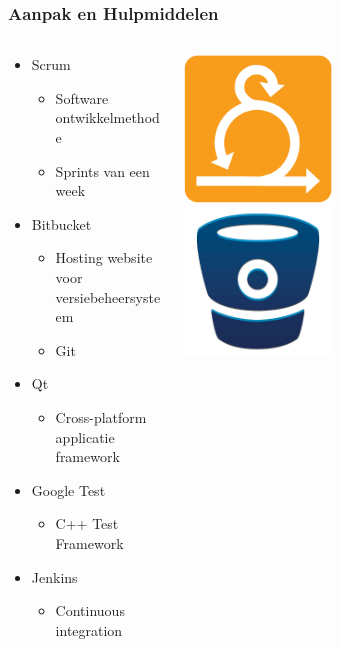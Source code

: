 \begin{frame}\frametitle{Aanpak en Hulpmiddelen}
	\begin{columns}[T]
  		\begin{column}{.7\textwidth}
			\begin{itemize}
				\item Scrum
					\begin{itemize}
						\item Software ontwikkelmethode
						\item Sprints van een week
					\end{itemize}
				\item Bitbucket
					\begin{itemize}
						\item Hosting website voor versiebeheersysteem
						\item Git
					\end{itemize}
				\item Qt
					\begin{itemize}
						\item Cross-platform applicatie framework
					\end{itemize}
				\item Google Test
					\begin{itemize}
						\item C++ Test Framework
					\end{itemize}
				\item Jenkins
					\begin{itemize}
						\item Continuous integration
					\end{itemize}
			\end{itemize}
		\end{column}
		\begin{column}{.3\textwidth}
			\includegraphics[width=0.45\textwidth]{images/scrum.png}\\
			\includegraphics[width=0.45\textwidth]{images/bitbucket.jpg}\\

\end{column}
\end{columns}
\end{frame}
